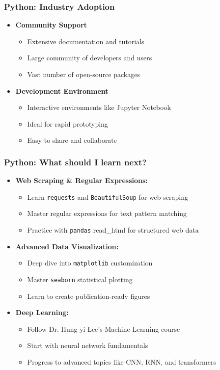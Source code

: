 \documentclass[10pt]{beamer}
\begin{document}
\begin{frame}
    \frametitle{Python: Industry Adoption}
    \begin{itemize}
        \item \textbf{Community Support}
            \begin{itemize}
                \item Extensive documentation and tutorials
                \item Large community of developers and users
                \item Vast number of open-source packages
            \end{itemize}
        \item \textbf{Development Environment}
            \begin{itemize}
                \item Interactive environments like Jupyter Notebook
                \item Ideal for rapid prototyping
                \item Easy to share and collaborate
            \end{itemize}
    \end{itemize}
\end{frame}

\begin{frame}
    \frametitle{Python: What should I learn next?}
    \begin{itemize}
        \item \textbf{Web Scraping \& Regular Expressions:}
            \begin{itemize}
                \item Learn \texttt{requests} and \texttt{BeautifulSoup} for web scraping
                \item Master regular expressions for text pattern matching
                \item Practice with \texttt{pandas} read\_html for structured web data
            \end{itemize}
        \item \textbf{Advanced Data Visualization:}
            \begin{itemize}
                \item Deep dive into \texttt{matplotlib} customization
                \item Master \texttt{seaborn} statistical plotting
                \item Learn to create publication-ready figures
            \end{itemize}
        \item \textbf{Deep Learning:}
            \begin{itemize}
                \item Follow Dr. Hung-yi Lee's Machine Learning course
                \item Start with neural network fundamentals
                \item Progress to advanced topics like CNN, RNN, and transformers
            \end{itemize}
    \end{itemize}
\end{frame}
\end{document}
